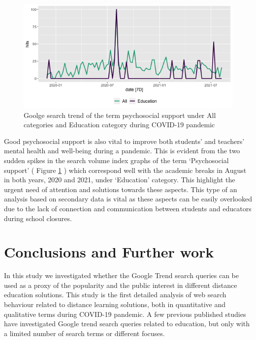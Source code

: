 \documentclass[11pt,a4paper,]{article}
\begin{document}
\begin{figure}[h]

{\centering \includegraphics[width=1\textwidth]{figure/psychosocialSupport-1} 

}

\caption{Goolge search trend of the term psychosocial support under All categories and Education category during COVID-19 pandemic}\label{fig:psychosocialSupport}
\end{figure}

Good psychosocial support is also vital to improve both students' and teachers' mental health and well-being during a pandemic. This is evident from the two sudden spikes in the search volume index graphs of the term `Psychosocial support' ( Figure \ref{fig:psychosocialSupport} ) which correspond well with the academic breaks in August in both years, 2020 and 2021, under `Education' category. This highlight the urgent need of attention and solutions towards these aspects. This type of an analysis based on secondary data is vital as these aspects can be easily overlooked due to the lack of connection and communication between students and educators during school closures.

\hypertarget{conclusions-and-further-work}{%
\section{Conclusions and Further work}\label{conclusions-and-further-work}}

In this study we investigated whether the Google Trend search queries can be used as a proxy of the popularity and the public interest in different distance education solutions. This study is the first detailed analysis of web search behaviour related to distance learning solutions, both in quantitative and qualitative terms during COVID-19 pandemic. A few previous published studies \autocite{vaughan2014web,kansal2021google} have investigated Google trend search queries related to education, but only with a limited number of search terms or different focuses.
\end{document}
